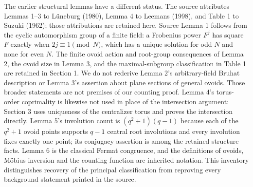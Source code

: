 The earlier structural lemmas have a different status. The source
attributes Lemmas 1--3 to Lüneburg (1980), Lemma 4 to Leemans (1998),
and Table 1 to Suzuki (1962); those attributions are retained here. Source Lemma 1
follows from the cyclic automorphism group of a finite field: a
Frobenius power \(F^j\) has square \(F\) exactly when
\(2j\equiv1\pmod N\), which has a unique solution for odd \(N\) and none
for even \(N\). The finite ovoid action and root-group consequences of
Lemma 2, the ovoid size in Lemma 3, and the maximal-subgroup
classification in Table 1 are retained in Section 1. We do not rederive
Lemma 2's arbitrary-field Bruhat description or Lemma 3's assertion
about plane sections of general ovoids. Those broader statements are not
premises of our counting proof. Lemma 4's torus-order coprimality is
likewise not used in place of the intersection argument: Section 3 uses
uniqueness of the centralizer torus and proves the intersection
directly. Lemma 5's involution count is \((q^2+1)(q-1)\) because each of
the \(q^2+1\) ovoid points supports \(q-1\) central root involutions and
every involution fixes exactly one point; its conjugacy assertion is
among the retained structure facts. Lemma 6 is the classical Fermat
congruence, and the definitions of ovoids, Möbius inversion and the
counting function are inherited notation. This inventory distinguishes
recovery of the principal classification from reproving every background
statement printed in the source.
